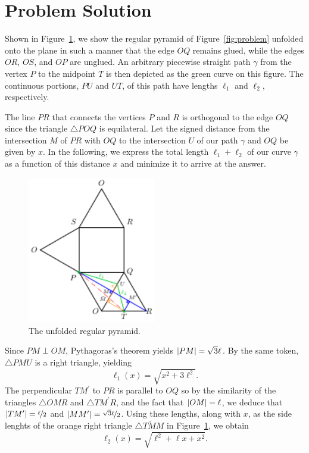 \section{Problem Solution}
\label{sec:solution}

Shown in Figure~\ref{fig:unfolded}, we show the regular pyramid of
Figure~\ref{fig:problem} unfolded onto the plane in such a manner that the edge
$OQ$ remains glued, while the edges $OR$, $OS$, and $OP$ are unglued. An
arbitrary piecewise straight path $\gamma$ from the vertex $P$ to the midpoint
$T$ is then depicted as the green curve on this figure. The continuous portions,
$PU$ and $UT$, of this path have lengths $\ell_1$ and $\ell_2$, respectively.

The line $PR$ that connects the vertices $P$ and $R$ is orthogonal to the edge
$OQ$ since the triangle $\triangle POQ$ is equilateral. Let the signed distance
from the intersection $M$ of $PR$ with $OQ$ to the intersection $U$ of our path
$\gamma$ and $OQ$ be given by $x$. In the following, we express the total length
$\ell_1 + \ell_2$ of our curve $\gamma$ as a function of this distance $x$ and
minimize it to arrive at the answer.

\begin{figure}[h]
  \centering
  \includegraphics[trim={0 0 0
  0cm},clip,width=0.5\textwidth]{./figures/pyramid-unfolded.pdf}
  \vspace{-8mm}
  \caption{The unfolded regular pyramid.}
  \label{fig:unfolded}
\end{figure}

Since $PM \perp OM$, Pythagoras's theorem yields $\left|{PM}\right| = \sqrt{3}\ell$. By
the same token, $\triangle PMU$ is a right triangle, yielding 
%
\begin{equation}
    \ell_1(x) = \sqrt{x^2 + 3\ell^2}. 
    \label{eq:ell1}
\end{equation}    
%
The perpendicular $TM^\prime$ to $PR$ is parallel to $OQ$ so by the similarity
of the triangles $\triangle OMR$ and $\triangle TM^\prime R$, and the fact that
$\left|{OM}\right| = \ell$, we deduce that $\left|{TM^\prime}\right| = \nicefrac{\ell}{2}$ and
$\left|{MM^\prime}\right| = \nicefrac{\sqrt{3}\ell}{2}$. Using these lengths, along with
$x$, as the side lenghts of the orange right triangle $\triangle T\tilde{M}M$ in
Figure~\ref{fig:unfolded}, we obtain 
%
\begin{equation}
  \ell_2(x) = \sqrt{\ell^2 + \ell x + x^2}.
  \label{eq:ell2}
\end{equation}

